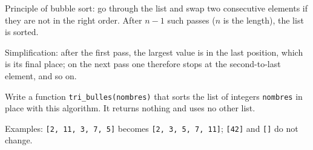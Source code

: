 Principle of bubble sort: go through the list and swap two consecutive elements if they are not in the right order. After $n - 1$ such passes ($n$ is the length), the list is sorted.

Simplification: after the first pass, the largest value is in the last position, which is its final place; on the next pass one therefore stops at the second-to-last element, and so on.

Write a function \texttt{tri\_bulles(nombres)} that sorts the list of integers \texttt{nombres} in place with this algorithm. It returns nothing and uses no other list.

Examples: \texttt{[2, 11, 3, 7, 5]} becomes \texttt{[2, 3, 5, 7, 11]}; \texttt{[42]} and \texttt{[]} do not change.
